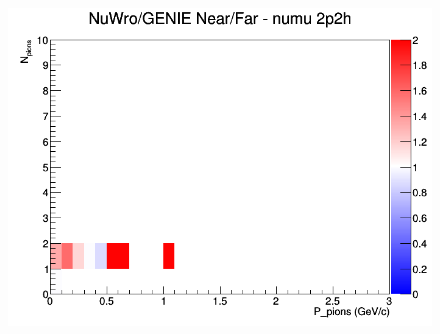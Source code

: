 \documentclass[12pt]{article}
\begin{document}
\begin{figure}[h]
\endminipage
{}
\includegraphics[width=\linewidth]{N_P/nominal/pions/ratios/2p2h_NuWro_GENIE_numu_NF_N_P.png}
\endminipage
\newline
\end{figure}
\clearpage
\end{document}
